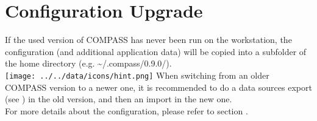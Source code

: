 \section{Configuration Upgrade}

If the used version of COMPASS has never been run on the workstation, the configuration (and additional application data) will be copied into a subfolder of the home directory (e.g. \textasciitilde/.compass/0.9.0/). \\

\texttt{[image: ../../data/icons/hint.png]} When switching from an older COMPASS version to a newer one, it is recommended to do a data sources export (see ) in the old version, 
and then an import in the new one. \\

For more details about the configuration, please refer to section .
